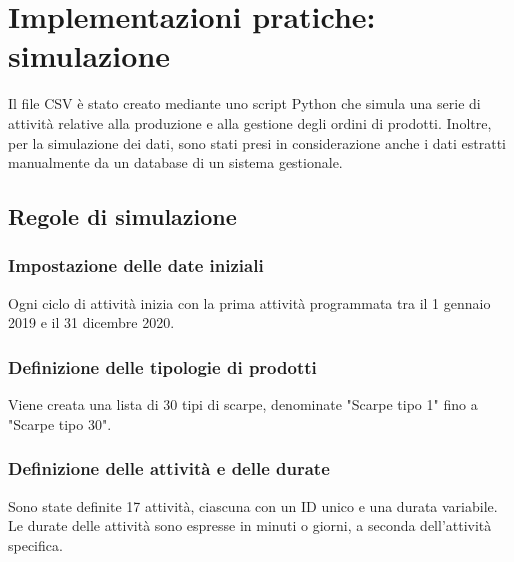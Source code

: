 \documentclass{article}
\begin{document}
\section{Implementazioni pratiche: simulazione}
Il file CSV è stato creato mediante uno script Python che simula una serie di attività relative alla produzione e alla gestione degli ordini di prodotti. Inoltre, per la simulazione dei dati, sono stati presi in considerazione anche i dati estratti manualmente da un database di un sistema gestionale.
\subsection{Regole di simulazione}
\subsubsection{Impostazione delle date iniziali}
Ogni ciclo di attività inizia con la prima attività programmata tra il 1 gennaio 2019 e il 31 dicembre 2020.\\
\subsubsection{Definizione delle tipologie di prodotti}
Viene creata una lista di 30 tipi di scarpe, denominate "Scarpe tipo 1" fino a "Scarpe tipo 30".\\
\subsubsection{Definizione delle attività e delle durate}
Sono state definite 17 attività, ciascuna con un ID unico e una durata variabile. Le durate delle attività sono espresse in minuti o giorni, a seconda dell'attività specifica.\\
\end{document}
